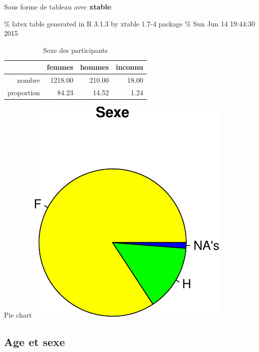 \documentclass[]{article}
\begin{document}
Sous forme de tableau avec \textbf{xtable}:

\% latex table generated in R 3.1.3 by xtable 1.7-4 package \% Sun Jun
14 19:44:30 2015

\begin{table}[ht]
\centering
\begin{tabular}{rrrr}
  \hline
 & femmes & hommes & inconnu \\ 
  \hline
nombre & 1218.00 & 210.00 & 18.00 \\ 
  proportion & 84.23 & 14.52 & 1.24 \\ 
   \hline
\end{tabular}
\caption{Sexe des participants} 
\label{sexe}
\end{table}

Pie chart
\includegraphics{qs_etudiants_files/figure-latex/pie_sexe-1.pdf}

\subsection{Age et sexe}\label{age-et-sexe}
\end{document}
